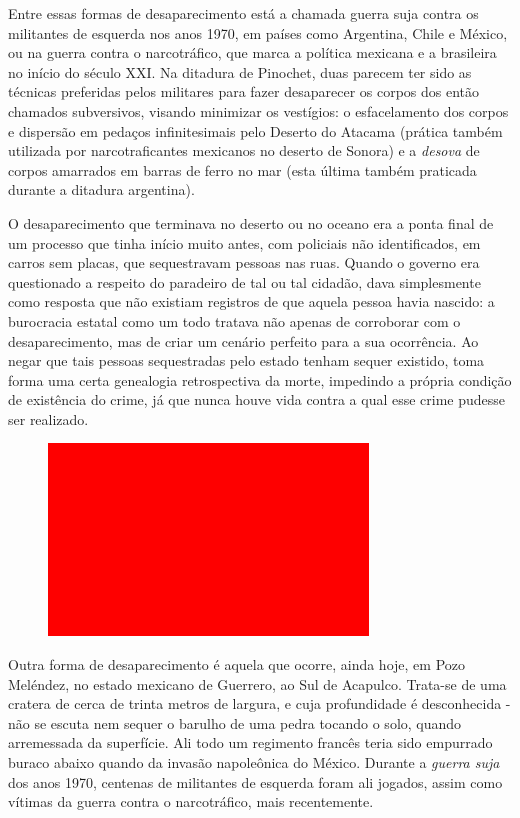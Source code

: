 Entre essas formas de desaparecimento está a chamada guerra suja contra
os militantes de esquerda nos anos 1970, em países como Argentina, Chile
e México, ou na guerra contra o narcotráfico, que marca a política
mexicana e a brasileira no início do século XXI. Na ditadura de
Pinochet, duas parecem ter sido as técnicas preferidas pelos militares
para fazer desaparecer os corpos dos então chamados subversivos, visando
minimizar os vestígios: o esfacelamento dos corpos e dispersão em
pedaços infinitesimais pelo Deserto do Atacama (prática também utilizada
por narcotraficantes mexicanos no deserto de Sonora) e a \emph{desova}
de corpos amarrados em barras de ferro no mar (esta última também
praticada durante a ditadura argentina).

O desaparecimento que terminava no deserto ou no oceano era a ponta
final de um processo que tinha início muito antes, com policiais não
identificados, em carros sem placas, que sequestravam pessoas nas ruas.
Quando o governo era questionado a respeito do paradeiro de tal ou tal
cidadão, dava simplesmente como resposta que não existiam registros de
que aquela pessoa havia nascido: a burocracia estatal como um todo
tratava não apenas de corroborar com o desaparecimento, mas de criar um
cenário perfeito para a sua ocorrência. Ao negar que tais pessoas
sequestradas pelo estado tenham sequer existido, toma forma uma certa
genealogia retrospectiva da morte, impedindo a própria condição de
existência do crime, já que nunca houve vida contra a qual esse crime
pudesse ser realizado.

\begin{figure}[!ht]
\centering
 \includegraphics[width=85mm]{./imgs/im1.jpg}
\caption{\footnotesize{}}
\end{figure}


Outra forma de desaparecimento é aquela que ocorre, ainda hoje, em Pozo
Meléndez, no estado mexicano de Guerrero, ao Sul de Acapulco. Trata-se
de uma cratera de cerca de trinta metros de largura, e cuja profundidade
é desconhecida - não se escuta nem sequer o barulho de uma pedra tocando
o solo, quando arremessada da superfície. Ali todo um regimento francês
teria sido empurrado buraco abaixo quando da invasão napoleônica do
México. Durante a \emph{guerra suja} dos anos 1970, centenas de
militantes de esquerda foram ali jogados, assim como vítimas da guerra
contra o narcotráfico, mais recentemente.

